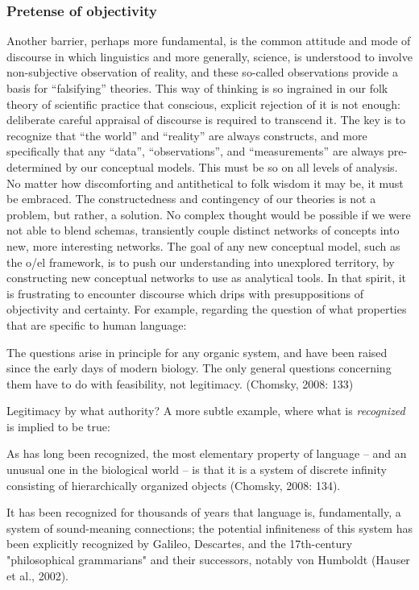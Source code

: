 \subsubsection{Pretense of objectivity}

Another barrier, perhaps more fundamental, is the common attitude and mode of discourse in which linguistics and more generally, science, is understood to involve non-subjective observation of reality, and these so-called observations provide a basis for “falsifying” theories. This way of thinking is so ingrained in our folk theory of scientific practice that conscious, explicit rejection of it is not enough: deliberate careful appraisal of discourse is required to transcend it. The key is to recognize that “the world” and “reality” are always constructs, and more specifically that any “data”, “observations”, and “measurements” are always pre-determined by our conceptual models. This must be so on all levels of analysis. No matter how discomforting and antithetical to folk wisdom it may be, it must be embraced. The constructedness and contingency of our theories is not a problem, but rather, a solution. No complex thought would be possible if we were not able to blend schemas, transiently couple distinct networks of concepts into new, more interesting networks. The goal of any new conceptual model, such as the o/el framework, is to push our understanding into unexplored territory, by constructing new conceptual networks to use as analytical tools. In that spirit, it is frustrating to encounter discourse which drips with presuppositions of objectivity and certainty. For example, regarding the question of what properties that are specific to human language:

The questions arise in principle for any organic system, and have been raised since the early days of modern biology. The only general questions concerning them have to do with feasibility, not legitimacy. (Chomsky, 2008: 133)

Legitimacy by what authority? A more subtle example, where what is \textit{recognized} is implied to be true:

As has long been recognized, the most elementary property of language – and an unusual one in the biological world – is that it is a system of discrete infinity consisting of hierarchically organized objects (Chomsky, 2008: 134).

It has been recognized for thousands of years that language is, fundamentally, a system of sound-meaning connections; the potential infiniteness of this system has been explicitly recognized by Galileo, Descartes, and the 17th-century "philosophical grammarians" and their successors, notably von Humboldt (Hauser et al., 2002).

